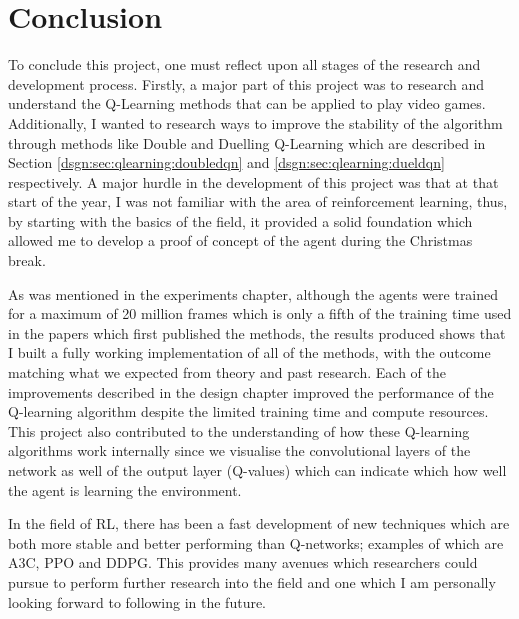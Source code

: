 \chapter{Conclusion}

To conclude this project, one must reflect upon all stages of the research and development process. Firstly, a major part of this project was to research and understand the Q-Learning methods that can be applied to play video games. Additionally, I wanted to research ways to improve the stability of the algorithm through methods like Double and Duelling Q-Learning which are described in Section \ref{dsgn:sec:qlearning:doubledqn} and \ref{dsgn:sec:qlearning:dueldqn} respectively. A major hurdle in the development of this project was that at that start of the year, I was not familiar with the area of reinforcement learning, thus, by starting with the basics of the field, it provided a solid foundation which allowed me to develop a proof of concept of the agent during the Christmas break.

As was mentioned in the experiments chapter, although the agents were trained for a maximum of 20 million frames which is only a fifth of the training time used in the papers which first published the methods, the results produced shows that I built a fully working implementation of all of the methods, with the outcome matching what we expected from theory and past research. Each of the improvements described in the design chapter improved the performance of the Q-learning algorithm despite the limited training time and compute resources. This project also contributed to the understanding of how these Q-learning algorithms work internally since we visualise the convolutional layers of the network as well of the output layer (Q-values) which can indicate which how well the agent is learning the environment.

In the field of RL, there has been a fast development of new techniques which are both more stable and better performing than Q-networks; examples of which are A3C\cite{mnih2016asynchronous}, PPO\cite{schulman2017proximal} and DDPG\cite{lillicrap2015continuous}. This provides many avenues which researchers could pursue to perform further research into the field and one which I am personally looking forward to following in the future.